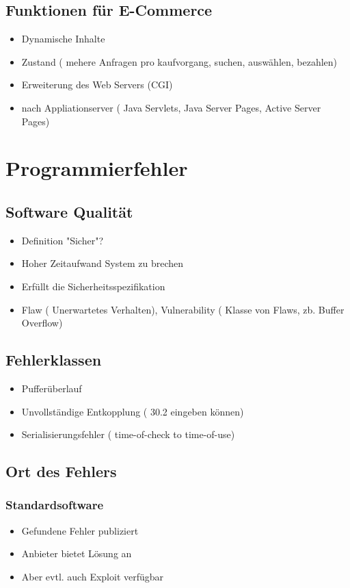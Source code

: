 \subsection*{Funktionen für E-Commerce}
\begin{itemize}
	\item 	Dynamische Inhalte
	\item  Zustand ( mehere Anfragen pro kaufvorgang, suchen, auswählen, bezahlen)
	\item Erweiterung des Web Servers (CGI)
	\item nach Appliationserver ( Java Servlets, Java Server Pages, Active Server Pages)
\end{itemize}


	\section*{Programmierfehler}
	
	\subsection*{Software Qualität}
	\begin{itemize}
		\item Definition "Sicher"?
		\item Hoher Zeitaufwand System zu brechen
		\item Erfüllt die Sicherheitsspezifikation
		\item Flaw ( Unerwartetes Verhalten), Vulnerability ( Klasse von Flaws, zb. Buffer Overflow)
	\end{itemize}

\subsection*{ Fehlerklassen}
\begin{itemize}
	\item Pufferüberlauf
	\item Unvollständige Entkopplung ( 30.2 eingeben können)
	\item Serialisierungsfehler ( time-of-check to time-of-use)
\end{itemize}

\subsection*{ Ort des Fehlers}
\subsubsection*{Standardsoftware}
\begin{itemize}
	\item Gefundene Fehler publiziert
	\item Anbieter bietet Lösung an
	\item Aber evtl. auch Exploit verfügbar
\end{itemize}
